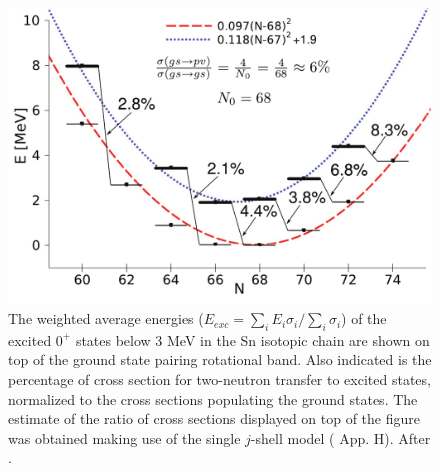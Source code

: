   \begin{figure}
  \centerline{\includegraphics*[width=\textwidth,angle=0]{nutshell/figs/fig2_1_4.pdf}}
  \caption[Sn pairing rotational band.]{ The weighted average energies ($E_{exc}=\sum_i E_i \sigma_i/\sum_i \sigma_i$) of the excited $0^+$ states below 3 MeV in the Sn isotopic chain are shown on top of the ground state pairing rotational band. Also indicated is the percentage of cross section for two-neutron transfer to excited states, normalized to the cross sections populating the ground states. The estimate of the ratio of cross sections displayed on top of the figure was obtained making use of the single $j$-shell model (\cite{Brink:05} App. H). After \cite{Potel:13b}.}\label{fig1.4}
  \end{figure}
